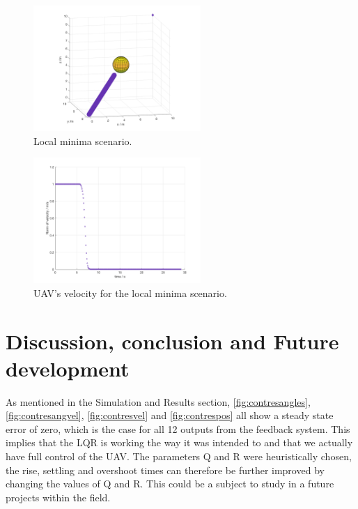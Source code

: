 \documentclass[journal]{IEEEtran}
\begin{document}
		\begin{figure}[h]
			\centering
			\includegraphics[width=2.5in]{Results/Potentialfields/localminima}
			\caption{Local minima scenario.}
			\label{fig:localminima}
		\end{figure}
		\begin{figure}[h]
			\centering
			\includegraphics[width=2.5in]{Results/Potentialfields/localminima_velocity}
			\caption{UAV's velocity for the local minima scenario.}
			\label{fig:localminima_velocity}
		\end{figure}
		
	\section{Discussion, conclusion and Future development}
	As mentioned in the Simulation and Results section, \figurename{ \ref{fig:contresangles}}, \figurename{ \ref{fig:contresangvel}}, \figurename{ \ref{fig:contresvel}} and \figurename{ \ref{fig:contrespos}} all show a steady state error of zero, which is the case for all 12 outputs from the feedback system. This implies that the LQR is working the way it was intended to and that we actually have full control of the UAV. The parameters Q and R were heuristically chosen, the rise, settling and overshoot times can therefore be further improved by changing the values of Q and R. This could be a subject to study in a  future projects within the field. \\
\end{document}

